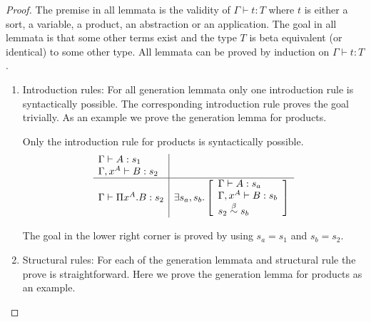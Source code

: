 \begin{theorem}
    \begin{proof}
        The premise in all lemmata is the validity of $\Gamma \vdash t : T$
        where $t$ is either a sort, a variable, a product, an abstraction or an
        application. The goal in all lemmata is that some other terms exist and
        the type $T$ is beta equivalent (or identical) to some other type. All
        lemmata can be proved by induction on $\Gamma \vdash t : T$.

        \begin{enumerate}
        \item Introduction rules: For all generation lemmata only one
            introduction rule is syntactically possible. The corresponding
                introduction rule proves the goal trivially. As an example we
                prove the generation lemma for products.

                Only the introduction rule for products is syntactically
                possible.
                $$
                \begin{array}{l|l}
                    \Gamma \vdash A: s_1
                    \\
                    \Gamma, x^A \vdash B: s_2
                    \\
                    \hline
                    \Gamma \vdash \Pi x^A. B : s_2
                    &
                    \exists s_a, s_b.
                    \left[
                    \begin{array}{l}
                        \Gamma \vdash A : s_a
                        \\
                        \Gamma, x^A \vdash B : s_b
                        \\
                        s_2 \stackrel{\beta}{\sim} s_b
                    \end{array}
                    \right]
                \end{array}
                $$

                The goal in the lower right corner is proved by using $s_a =
                    s_1$ and $s_b = s_2$.

        \item Structural rules: For each of the generation lemmata and
            structural rule the prove is straightforward. Here we prove the
                generation lemma for products as an example.


\end{enumerate}
\end{proof}
\end{theorem}
